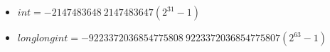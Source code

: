 \begin{itemize} 

\item $int = -2147483648 ~ 2147483647 (2^31 - 1)$
\item $long long int = -9223372036854775808 ~ 9223372036854775807 (2^63 - 1)$

\end{itemize}